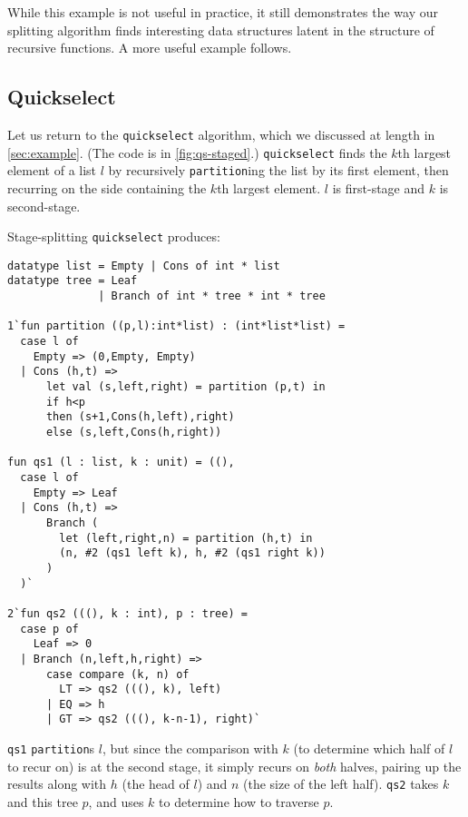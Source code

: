 While this example is not useful in practice, it still demonstrates the way our
splitting algorithm finds interesting data structures latent in the structure
of recursive functions. A more useful example follows.


\subsection{Quickselect}
\label {sec:exampleQS}

Let us return to the \texttt{quickselect} algorithm, which we discussed at
length in \ref{sec:example}. (The code is in \ref{fig:qs-staged}.)
\texttt{quickselect} finds the $k$th largest element of a list $l$ by
recursively \texttt{partition}ing the list by its first element, then recurring
on the side containing the $k$th largest element. $l$ is first-stage and $k$ is
second-stage.

Stage-splitting \texttt{quickselect} produces:
%
\begin{lstlisting} 
datatype list = Empty | Cons of int * list
datatype tree = Leaf
              | Branch of int * tree * int * tree

1`fun partition ((p,l):int*list) : (int*list*list) = 
  case l of 
    Empty => (0,Empty, Empty) 
  | Cons (h,t) => 
      let val (s,left,right) = partition (p,t) in 
      if h<p 
      then (s+1,Cons(h,left),right) 
      else (s,left,Cons(h,right))

fun qs1 (l : list, k : unit) = ((), 
  case l of
    Empty => Leaf
  | Cons (h,t) => 
      Branch (
        let (left,right,n) = partition (h,t) in
        (n, #2 (qs1 left k), h, #2 (qs1 right k))
      )
  )`

2`fun qs2 (((), k : int), p : tree) = 
  case p of
    Leaf => 0
  | Branch (n,left,h,right) =>
      case compare (k, n) of 
        LT => qs2 (((), k), left) 
      | EQ => h 
      | GT => qs2 (((), k-n-1), right)`
\end{lstlisting}
%
\texttt{qs1} \texttt{partition}s $l$, but since the comparison with $k$ (to
determine which half of $l$ to recur on) is at the second stage, it simply
recurs on \emph{both} halves, pairing up the results along with $h$ (the head of
$l$) and $n$ (the size of the left half). \texttt{qs2} takes $k$ and this tree
$p$, and uses $k$ to determine how to traverse $p$.

